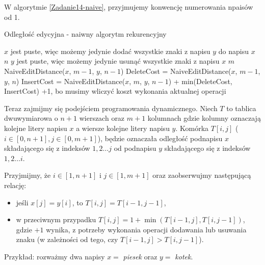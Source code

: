 W algorytmie \ref{Zadanie14-naive}, przyjmujemy konwencję numerowania npaisów od 1.
\begin{algorithm}[H]
	\caption{Odległość edycyjna - naiwny algorytm rekurencyjny}
	\begin{algorithmic}[1]
		\Comment $x$ jest puste, więc możemy jedynie dodać wszystkie znaki z napisu $y$ do napisu $x$
		\State \Return $n$ 
		\EndIf
		\Comment $y$ jest puste, więc możemy jedynie usunąć wszystkie znaki z napisu $x$
		\State \Return $m$ 
		\EndIf
		\State \Return NaiveEditDistance($x$, $m - 1$, $y$, $n - 1$)
		\Else
		\State DeleteCost = NaiveEditDistance($x$, $m - 1$, $y$, $n$)
		\State InsertCost = NaiveEditDistance($x$, $m$, $y$, $n - 1$)
		\State {} + min(DeleteCost, InsertCost) \Comment +1, bo musimy wliczyć koszt wykonania aktualnej operacji
		\EndIf
		\EndProcedure 
	\end{algorithmic}
	\label{Zadanie14-naive}
\end{algorithm}

Teraz zajmijmy się podejściem programowania dynamicznego.
Niech $T$ to tablica dwuwymiarowa o
$n + 1$ wierszach oraz $m + 1$ kolumnach
gdzie kolumny oznaczają kolejne litery napisu $x$ a
wiersze kolejne litery napisu $y$. Komórka
$T[i, j]$ ($i \in [0, n+1], j \in [0, m+1]$), będzie 
oznaczała odległość 
podnapisu $x$ składającego się z indeksów $1,2 \ldots j$ od 
podnapisu $y$ składającego się z indeksów $1,2 \ldots i$.

Przyjmijmy, że $i \in [1, n+1]$ i $ j \in [1, m+1]$ oraz 
zaobserwujmy następującą relację: 
\begin{itemize}
	\item jeśli $x[j]=y[i]$, to $T[i, j] = T[i - 1, j - 1]$,
	\item w przeciwnym przypadku $T[i, j] = 1 + \min(T[i - 1, j], T[i, j - 1])$, gdzie
	$+1$ wynika, z potrzeby wykonania operacji dodawania lub usuwania znaku
	(w zależności od tego, czy $T[i - 1, j] > T[i, j - 1]$).
\end{itemize}

Przykład: rozważmy dwa napisy $x =$ \textit{piesek} oraz $y =$ \textit{kotek}.

